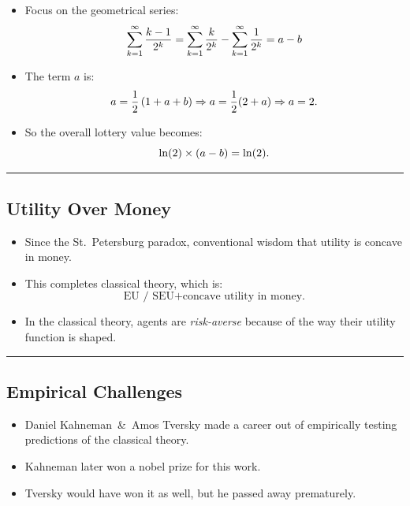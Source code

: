 \documentclass[
  letterpaper,
  DIV=11,
  numbers=noendperiod]{scrartcl}
\providecommand{\tightlist}{%
  \setlength{\itemsep}{0pt}\setlength{\parskip}{0pt}}\usepackage{longtable,booktabs,array}
\begin{document}
\begin{itemize}
\tightlist
\item
  Focus on the geometrical series: \[\small
    \sum_{k=1}^{\infty}\frac{k-1}{2^k} = \sum_{k=1}^{\infty}\frac{k}{2^k} - \sum_{k=1}^{\infty}\frac{1}{2^k} = a - b
  \]
\item
  The term \(a\) is: \[\small
    a
    = \frac{1}{2}\left(1 + a + b\right) \Rightarrow a = \frac{1}{2}(2 + a) \Rightarrow a = 2.
  \]
\item
  So the overall lottery value becomes: \[\small
  \ln(2)\times(a - b) = \ln(2).
  \]
\end{itemize}

\begin{center}\rule{0.5\linewidth}{0.5pt}\end{center}

\subsection{Utility Over Money}\label{utility-over-money}

\begin{itemize}
\tightlist
\item
  Since the St.~Petersburg paradox, conventional wisdom that utility is
  concave in money.
\item
  This completes classical theory, which is: \[
  \text{EU / SEU} + \text{concave utility in money.}
  \]
\item
  In the classical theory, agents are \emph{risk-averse} because of the
  way their utility function is shaped.
\end{itemize}

\begin{center}\rule{0.5\linewidth}{0.5pt}\end{center}

\subsection{Empirical Challenges}\label{empirical-challenges}

\begin{itemize}
\tightlist
\item
  Daniel Kahneman~\&~Amos Tversky made a career out of empirically
  testing predictions of the classical theory.
\item
  Kahneman later won a nobel prize for this work.
\item
  Tversky would have won it as well, but he passed away prematurely.
\end{itemize}
\end{document}
